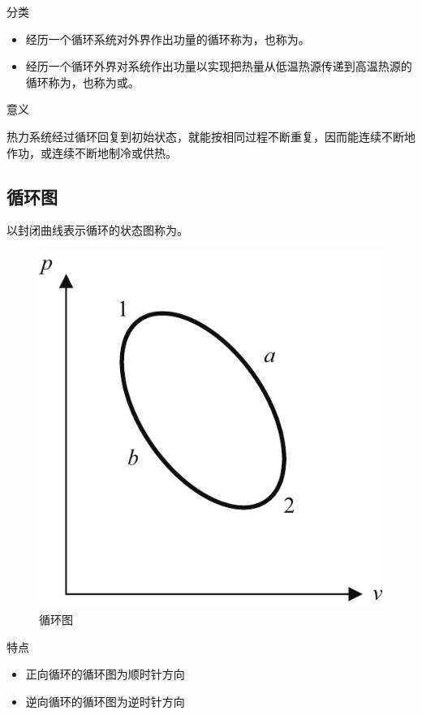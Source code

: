\noindent 分类\vspace*{-1em}
\begin{itemize}
	\item 经历一个循环系统对外界作出功量的循环称为，也称为。
	\item 经历一个循环外界对系统作出功量以实现把热量从低温热源传递到高温热源的循环称为，也称为或。
\end{itemize}


\noindent 意义

热力系统经过循环回复到初始状态，就能按相同过程不断重复，因而能连续不断地作功，或连续不断地制冷或供热。
\vspace*{1em}

\subsection{循环图}

\tdefination[循环图]
以封闭曲线表示循环的状态图称为。

\newpage
\begin{figure}[!htb]
		\centering
		\includegraphics[width=0.4\linewidth]{pic/数学描述曲线.pdf}
		\caption{循环图}
		\label{循环图}
\end{figure}

\noindent 特点\vspace*{-1em}
\begin{itemize}
	\item 正向循环的循环图为顺时针方向
	\item 逆向循环的循环图为逆时针方向
\end{itemize}
